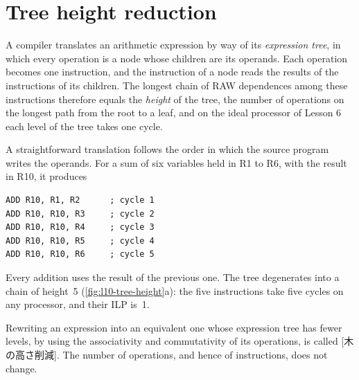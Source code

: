 \documentclass[../main.tex]{subfiles}
\begin{document}
\section{Tree height reduction}
\label{sec:l10-thr}

A compiler translates an arithmetic expression by way of its \emph{expression
tree}, in which every operation is a node whose children are its
operands.  Each operation
becomes one instruction, and the instruction of a node reads the results of
the instructions of its children.  The longest chain of RAW dependences among
these instructions therefore equals the \emph{height} of the tree, the number
of operations on the longest path from the root to a leaf, and on the ideal
processor of Lesson 6 each level of the tree takes one cycle.

A straightforward translation follows the order in which the source program
writes the operands.  For a sum of six variables held in R1 to R6, with the
result in R10, it produces
\begin{lstlisting}[language={[x86masm]Assembler}, numbers=none]
ADD R10, R1, R2      ; cycle 1
ADD R10, R10, R3     ; cycle 2
ADD R10, R10, R4     ; cycle 3
ADD R10, R10, R5     ; cycle 4
ADD R10, R10, R6     ; cycle 5
\end{lstlisting}
Every addition uses the result of the previous one.  The tree degenerates into
a chain of height~5 (\cref{fig:l10-tree-height}a): the five instructions take
five cycles on any processor, and their ILP is~1.

\begin{definition}
  \label{def:l10-thr}
  Rewriting an expression into an equivalent one whose expression tree has
  fewer levels, by using the associativity and commutativity of its
  operations, is called [木の高さ削減].  The number
  of operations, and hence of instructions, does not change.
\end{definition}
\end{document}
